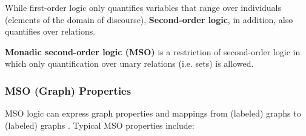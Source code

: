 \documentclass[a4paper, 12pt, bibliography=totoc]{scrartcl}
\begin{document}
While first-order logic only quantifies variables that range over individuals (elements of the domain of discourse),
\textbf{Second-order logic}, in addition, also quantifies over relations.

\textbf{Monadic second-order logic (MSO)} is a restriction of second-order logic in which only quantification over unary relations (i.e. sets) is allowed. 


%


\subsubsection{MSO (Graph) Properties}
MSO logic can express graph properties and mappings from (labeled) graphs to (labeled) graphs \cite{CourcelleGROW}.
Typical MSO properties include:
\end{document}
